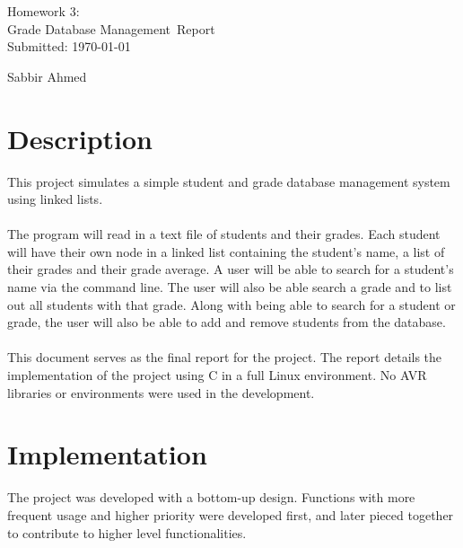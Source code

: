 \documentclass[usletter, 12pt]{article}
\newcommand{\project}{Homework 3: \\ Grade Database Management}
\newcommand{\Sabbir}{Sabbir Ahmed}
\begin{document}
    \begin{titlepage}

        \vspace*{\fill} %
        \begin{center}

            {\LARGE \project~Report}\\ [1.5cm]

            Submitted: \today
            
            \vspace*{\fill}

            \Sabbir

        \end{center}
        \vspace*{\fill} %

    \end{titlepage}

    \section{Description} This project simulates a simple student and grade
    database management system using linked lists. \\~\\
    \noindent The program will read in a text file of students and their
    grades. Each student will have their own node in a linked list containing
    the student's name, a list of their grades and their grade average. A user
    will be able to search for a student's name via the command line. The user
    will also be able search a grade and to list out all students with that
    grade. Along with being able to search for a student or grade, the user
    will also be able to add and remove students from the database. \\~\\
    \noindent This document serves as the final report for the project. The
    report details the implementation of the project using C in a full Linux
    environment. No AVR libraries or environments were used in the development.

    \section{Implementation} The project was developed with a bottom-up
    design. Functions with more frequent usage and higher priority were
    developed first, and later pieced together to contribute to higher level
    functionalities.
\end{document}
